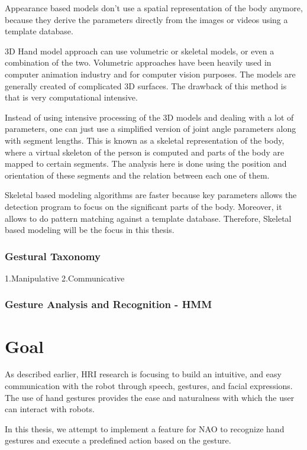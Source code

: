 Appearance based models don't use a spatial representation of the body anymore, because they derive the parameters directly from the images or videos using a template database. 

3D Hand model approach can use volumetric or skeletal models, or even a combination of the two. Volumetric approaches have been heavily used in computer animation industry and for computer vision purposes. The models are generally created of complicated 3D surfaces. The drawback of this method is that is very computational intensive. 

Instead of using intensive processing of the 3D models and dealing with a lot of parameters, one can just use a simplified version of joint angle parameters along with segment lengths. This is known as a skeletal representation of the body, where a virtual skeleton of the person is computed and parts of the body are mapped to certain segments. The analysis here is done using the position and orientation of these segments and the relation between each one of them.

Skeletal based modeling algorithms are faster because key parameters allows the detection program to focus on the significant parts of the body. Moreover, it allows to do pattern matching against a template database. Therefore, Skeletal based modeling will be the focus in this thesis.


\subsection{Gestural Taxonomy } 1.Manipulative 2.Communicative

\subsection{Gesture Analysis and Recognition - HMM}

\chapter{Goal} As described earlier, HRI research is focusing to build an intuitive, and easy communication with the robot through speech, gestures, and facial expressions. The use of hand gestures provides the ease and naturalness with which the user can interact with robots.

In this thesis, we attempt to implement a feature for NAO to recognize hand gestures and execute a predefined action based on the gesture. 


